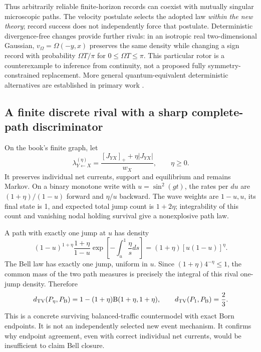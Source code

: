 \documentclass[11pt,oneside,openany]{book}
\theoremstyle{definition}
\theoremstyle{remark}\newtheorem{remark}[theorem]{Remark}
\providecommand{\TV}{d_{\mathrm{TV}}}
\providecommand{\pos}[1]{[#1]_+}
\begin{document}
Thus arbitrarily reliable finite-horizon records can coexist with mutually singular microscopic paths. The velocity postulate selects the adopted law \emph{within the new theory}; record success does not independently force that postulate. Deterministic divergence-free changes provide further rivals: in an isotropic real two-dimensional Gaussian, $v_\Omega=\Omega(-y,x)$ preserves the same density while changing a sign record with probability $\Omega T/\pi$ for $0\le\Omega T\le\pi$. This particular rotor is a counterexample to inference from continuity, not a proposed fully symmetry-constrained replacement. More general quantum-equivalent deterministic alternatives are established in primary work \cite{mc:Deotto}.

\subsection{A finite discrete rival with a sharp complete-path discriminator}
On the book's finite graph, let
\begin{equation}\label{mc:eq:etarates}
 \lambda^{(\eta)}_{Y\leftarrow X}=
 \frac{\pos{J_{YX}}+\eta|J_{YX}|}{w_X},\qquad\eta\ge0.
\end{equation}
It preserves individual net currents, support and equilibrium and remains Markov. On a binary monotone write with $u=\sin^2(gt)$, the rates per $du$ are $(1+\eta)/(1-u)$ forward and $\eta/u$ backward. The wave weights are $1-u,u$, its final state is 1, and expected total jump count is $1+2\eta$; integrability of this count and vanishing nodal holding survival give a nonexplosive path law.

A path with exactly one jump at $u$ has density
\[
 (1-u)^{1+\eta}\frac{1+\eta}{1-u}
       \exp\left[-\int_u^1\frac\eta s ds\right]
 =(1+\eta)[u(1-u)]^\eta.
\]
The Bell law has exactly one jump, uniform in $u$. Since $(1+\eta)4^{-\eta}\le1$, the common mass of the two path measures is precisely the integral of this rival one-jump density. Therefore
\begin{equation}\label{mc:eq:exactTV}
 \TV(P_\eta,P_{\rm B})=1-(1+\eta)\mathrm B(1+\eta,1+\eta),
 \qquad\TV(P_1,P_{\rm B})=\frac23.
\end{equation}
This is a concrete surviving balanced-traffic countermodel with exact Born endpoints. It is not an independently selected new event mechanism. It confirms why endpoint agreement, even with correct individual net currents, would be insufficient to claim Bell closure.
\end{document}
